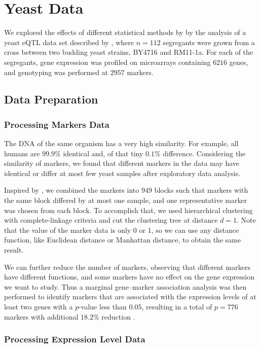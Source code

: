 \section{Yeast Data}

We explored the effects of different statistical methods by by the analysis of a yeast eQTL data set described by \citet{brem2005landscape}, where $n = 112$ segregants were grown from a cross between two budding yeast strains, BY4716 and RM11-1a. 
For each of the segregants, gene expression was profiled on microarrays containing $6216$ genes, and genotyping was performed at $2957$ markers. 


\subsection{Data Preparation}

\subsubsection{Processing Markers Data}

The DNA of the same organism has a very high similarity. 
For example, all humans are $99.9\%$ identical and, of that tiny $0.1\%$ difference. 
Considering the similarity of markers, we found that different markers in the data may have identical or differ at most few yeast samples after exploratory data analysis. 

Inspired by \citet{yin2011sparse}, we combined the markers into $949$ blocks such that markers with the same block differed by at most one sample, and one representative marker was chosen from each block. 
To accomplish that, we used hierarchical clustering with complete-linkage criteria and cut the clustering tree at distance $d=1$. 
Note that the value of the marker data is only 0 or 1, so we can use any distance function, like Euclidean distance or Manhattan distance, to obtain the same result.

We can further reduce the number of markers, observing that different markers have different functions, and some markers have no effect on the gene expression we want to study. 
Thus a marginal gene–marker association analysis was then performed to identify markers that are associated with the expression levels of at least two genes with a $p$-value less than $0.05$, resulting in a total of $p = 776$ markers with additional $18.2\%$ reduction . 


\subsubsection{Processing Expression Level Data}

